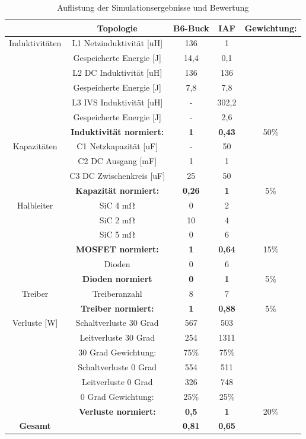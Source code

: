 \begin{table}
	\centering
	\begin{tabular}{|c|c|c|c|c|}
		\hline
		& Topologie & B6-Buck & \gls{IAF} & Gewichtung: \\
		\hline
		Induktivitäten& L1 Netzinduktivität [uH]& 136 & 1 &  \\
		\hline
		& Gespeicherte Energie [J]& 14,4 & 0,1 & \\
		\hline
		& L2 DC Induktivität [uH]& 136 & 136 &  \\
		\hline
		& Gespeicherte Energie [J]& 7,8 & 7,8 &  \\
		\hline
		& L3 IVS Induktivität [uH]& - & 302,2 &  \\
		\hline
		& Gespeicherte Energie [J] & - & 2,6 & \\
		\hline
		& \textbf{Induktivität normiert:} & \textbf{1}   & \textbf{0,43} & 50\% \\
		\hline
		Kapazitäten & C1 Netzkapazität [uF]& - & 50 &  \\
		\hline
		& C2 DC Ausgang [mF]& 1 & 1 &  \\
		\hline
		& C3 DC Zwischenkreis [uF]& 25 & 50 &  \\
		\hline
		& \textbf{Kapazität normiert:} & \textbf{0,26} &  \textbf{1} & 5\% \\
		\hline
		Halbleiter & SiC 4 \si{\milli \ohm} & 0 & 2 &  \\
		\hline
		& SiC 2 \si{\milli \ohm} & 10 & 4 &  \\
		\hline
		& SiC 5 \si{\milli \ohm} & 0 & 6 &  \\
		\hline
		& \textbf{MOSFET normiert:} & \textbf{1} &  \textbf{0,64} & 15\% \\
		\hline
		& Dioden & 0 & 6 &  \\
		\hline
		& \textbf{Dioden normiert} & \textbf{0} & \textbf{1} & 5\% \\
		\hline
		Treiber & Treiberanzahl & 8 & 7 &  \\
		\hline
		& \textbf{Treiber normiert:} & \textbf{1} & \textbf{0,88} & 5\% \\
		\hline
		Verluste [W] & Schaltverluste 30 Grad & 567 & 503 &  \\
		\hline
		& Leitverluste 30 Grad & 254 & 1311 &  \\
		\hline
		& 30 Grad Gewichtung: & 75\% & 75\% &  \\
		\hline
		& Schaltverluste 0 Grad & 554 & 511 &  \\
		\hline
		& Leitverluste 0 Grad & 326 & 748 &  \\
		\hline
		& 0 Grad Gewichtung: & 25\% & 25\% &  \\
		\hline
		& \textbf{Verluste normiert:} &\textbf{0,5} & \textbf{1} & 20\% \\
		\hline
		\textbf{Gesamt} &  & \textbf{0,81} & \textbf{0,65} & \\
		\hline
	\end{tabular}
	\caption{Auflistung der Simulationsergebnisse und Bewertung}
	\label{tab:Auswertung}
\end{table}